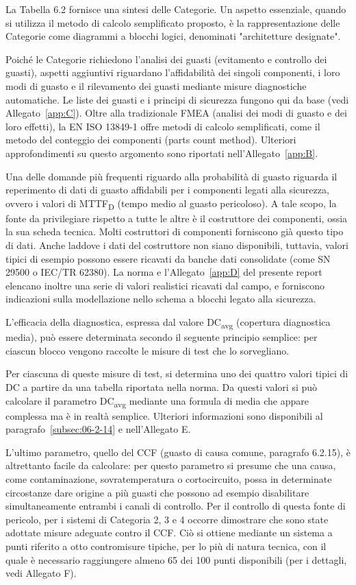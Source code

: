 La Tabella 6.2 fornisce una sintesi delle Categorie. Un aspetto essenziale, quando si utilizza il metodo di calcolo semplificato proposto, è la rappresentazione delle Categorie come diagrammi a blocchi logici, denominati "architetture designate".

Poiché le Categorie richiedono l'analisi dei guasti (evitamento e controllo dei guasti), aspetti aggiuntivi riguardano l'affidabilità dei singoli componenti, i loro modi di guasto e il rilevamento dei guasti mediante misure diagnostiche automatiche. Le liste dei guasti e i principi di sicurezza fungono qui da base (vedi Allegato~\ref{app:C}). Oltre alla tradizionale FMEA (analisi dei modi di guasto e dei loro effetti), la EN ISO 13849-1 offre metodi di calcolo semplificati, come il metodo del conteggio dei componenti (parts count method). Ulteriori approfondimenti su questo argomento sono riportati nell'Allegato~\ref{app:B}.

Una delle domande più frequenti riguardo alla probabilità di guasto riguarda il reperimento di dati di guasto affidabili per i componenti legati alla sicurezza, ovvero i valori di MTTF\textsubscript{D} (tempo medio al guasto pericoloso). A tale scopo, la fonte da privilegiare rispetto a tutte le altre è il costruttore dei componenti, ossia la sua scheda tecnica. Molti costruttori di componenti forniscono già questo tipo di dati. Anche laddove i dati del costruttore non siano disponibili, tuttavia, valori tipici di esempio possono essere ricavati da banche dati consolidate (come SN 29500 o IEC/TR 62380). La norma e l'Allegato~\ref{app:D} del presente report elencano inoltre una serie di valori realistici ricavati dal campo, e forniscono indicazioni sulla modellazione nello schema a blocchi legato alla sicurezza.

L'efficacia della diagnostica, espressa dal valore DC\textsubscript{avg} (copertura diagnostica media), può essere determinata secondo il seguente principio semplice: per ciascun blocco vengono raccolte le misure di test che lo sorvegliano.

Per ciascuna di queste misure di test, si determina uno dei quattro valori tipici di DC a partire da una tabella riportata nella norma. Da questi valori si può calcolare il parametro DC\textsubscript{avg} mediante una formula di media che appare complessa ma è in realtà semplice. Ulteriori informazioni sono disponibili al paragrafo~\ref{subsec:06-2-14} e nell'Allegato E.

L'ultimo parametro, quello del CCF (guasto di causa comune, paragrafo 6.2.15), è altrettanto facile da calcolare: per questo parametro si presume che una causa, come contaminazione, sovratemperatura o cortocircuito, possa in determinate circostanze dare origine a più guasti che possono ad esempio disabilitare simultaneamente entrambi i canali di controllo. Per il controllo di questa fonte di pericolo, per i sistemi di Categoria 2, 3 e 4 occorre dimostrare che sono state adottate misure adeguate contro il CCF. Ciò si ottiene mediante un sistema a punti riferito a otto contromisure tipiche, per lo più di natura tecnica, con il quale è necessario raggiungere almeno 65 dei 100 punti disponibili (per i dettagli, vedi Allegato F).

